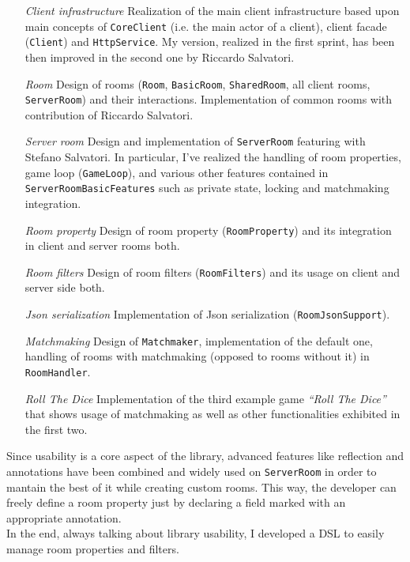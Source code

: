 \begin{itemize}

\item[\em{Client infrastructure}] Realization of the main client infrastructure based upon main concepts of \texttt{CoreClient} (i.e. the main actor of a client), client facade (\texttt{Client}) and \texttt{HttpService}. My version, realized in the first sprint, has been then improved in the second one by Riccardo Salvatori.

\item[\em{Room}] Design of rooms (\texttt{Room}, \texttt{BasicRoom}, \texttt{SharedRoom}, all client rooms, \texttt{ServerRoom}) and their interactions. Implementation of common rooms with contribution of Riccardo Salvatori.

\item[\em{Server room}] Design and implementation of \texttt{ServerRoom} featuring with Stefano Salvatori. In particular, I've realized the handling of room properties, game loop (\texttt{GameLoop}), and various other features contained in \texttt{ServerRoomBasicFeatures} such as private state, locking and matchmaking integration.

\item[\em{Room property}] Design of room property (\texttt{RoomProperty}) and its integration in client and server rooms both.

\item[\em{Room filters}] Design of room filters (\texttt{RoomFilters}) and its usage on client and server side both.

\item[\em{Json serialization}] Implementation of Json serialization (\texttt{RoomJsonSupport}).

\item[\em{Matchmaking}] Design of \texttt{Matchmaker}, implementation of the default one, handling of rooms with matchmaking (opposed to rooms without it) in \texttt{RoomHandler}.

\item[\em{Roll The Dice}] Implementation of the third example game \textit{``Roll The Dice''} that shows usage of matchmaking as well as other functionalities exhibited in the first two.

\end{itemize}

Since usability is a core aspect of the library, advanced features like reflection and annotations have been combined and widely used on \texttt{ServerRoom} in order to mantain the best of it while creating custom rooms. This way, the developer can freely define a room property just by declaring a field marked with an appropriate annotation.
\\
In the end, always talking about library usability, I developed a DSL to easily manage room properties and filters.





